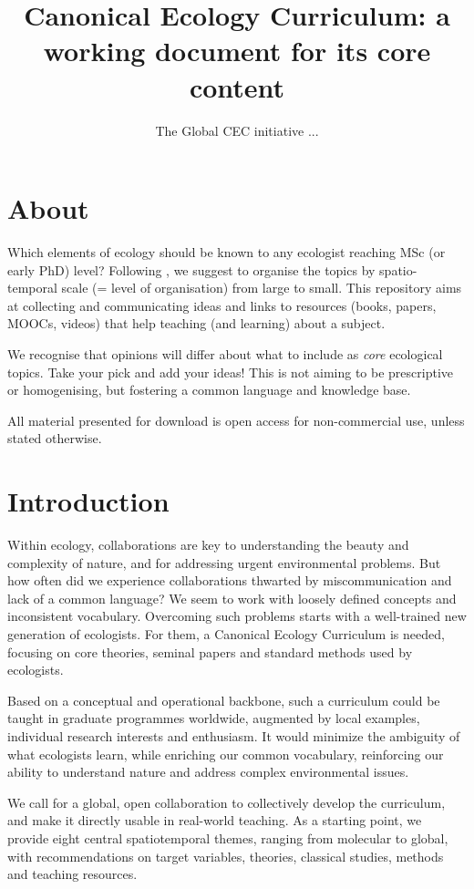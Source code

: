 \documentclass[english,11pt,a4paper, landscape]{article}
\title{Canonical Ecology Curriculum: a working document for its core content}
\author{The Global CEC initiative ...}
\begin{document}
\maketitle

\section{About}
Which elements of ecology should be known to any ecologist reaching MSc (or early PhD) level? Following \citet{Dormann2023}, we suggest to organise the topics by spatio-temporal scale (= level of organisation) from large to small. This repository aims at collecting and communicating ideas and links to resources (books, papers, MOOCs, videos) that help teaching (and learning) about a subject.

We recognise that opinions will differ about what to include as \emph{core} ecological topics. Take your pick and add your ideas! This is not aiming to be prescriptive or homogenising, but fostering a common language and knowledge base.

All material presented for download is open access for non-commercial use, unless stated otherwise.


\section{Introduction}
Within ecology, collaborations are key to understanding the beauty and complexity of nature, and for addressing urgent environmental problems. But how often did we experience collaborations thwarted by miscommunication and lack of a common language? We seem to work with loosely defined concepts and inconsistent vocabulary. Overcoming such problems starts with a well-trained new generation of ecologists. For them, a Canonical Ecology Curriculum is needed, focusing on core theories, seminal papers and standard methods used by ecologists.

Based on a conceptual and operational backbone, such a curriculum could be taught in graduate programmes worldwide, augmented by local examples, individual research interests and enthusiasm. It would minimize the ambiguity of what ecologists learn, while enriching our common vocabulary, reinforcing our ability to understand nature and address complex environmental issues. 

We call for a global, open collaboration to collectively develop the curriculum, and make it directly usable in real-world teaching. As a starting point, we provide eight central spatiotemporal themes, ranging from molecular to global, with recommendations on target variables, theories, classical studies, methods and teaching resources. 
\end{document}
